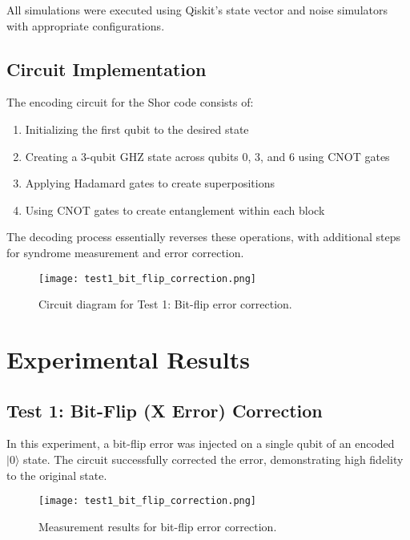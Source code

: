 \documentclass[12pt,a4paper]{article}
\begin{document}
All simulations were executed using Qiskit's state vector and noise simulators with appropriate configurations.

\subsection{Circuit Implementation}

The encoding circuit for the Shor code consists of:

\begin{enumerate}
    \item Initializing the first qubit to the desired state
    \item Creating a 3-qubit GHZ state across qubits 0, 3, and 6 using CNOT gates
    \item Applying Hadamard gates to create superpositions
    \item Using CNOT gates to create entanglement within each block
\end{enumerate}

The decoding process essentially reverses these operations, with additional steps for syndrome measurement and error correction.

\begin{figure}[H]
    \centering
    \texttt{[image: test1\_bit\_flip\_correction.png]}
    \caption{Circuit diagram for Test 1: Bit-flip error correction.}
    \label{fig:bit_flip_circuit}
\end{figure}

\section{Experimental Results}

\subsection{Test 1: Bit-Flip (X Error) Correction}

In this experiment, a bit-flip error was injected on a single qubit of an encoded $|0\rangle$ state. The circuit successfully corrected the error, demonstrating high fidelity to the original state.

\begin{figure}[H]
    \centering
    \texttt{[image: test1\_bit\_flip\_correction.png]}
    \caption{Measurement results for bit-flip error correction.}
    \label{fig:bit_flip_results}
\end{figure}
\end{document}
